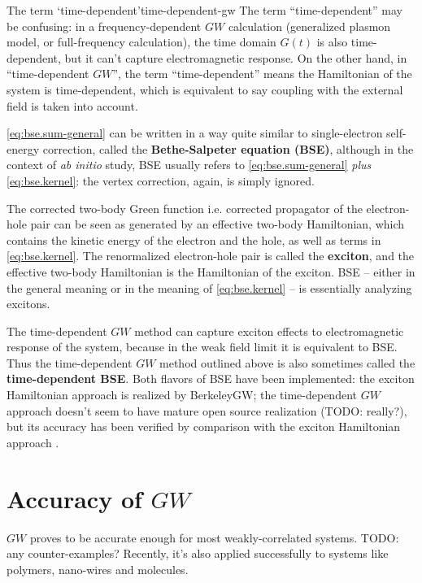 \documentclass[hyperref, a4paper, 12pt]{report}
\newcommand*{\concept}[1]{{\textbf{#1}}}
\newcommand*{\abinitio}{\textit{ab initio}}
\begin{document}
\begin{infobox}{The term `time-dependent'}{time-dependent-gw}
    The term ``time-dependent'' may be confusing:
    in a frequency-dependent $GW$ calculation 
    (generalized plasmon model, or full-frequency calculation),
    the time domain $G(t)$ is also time-dependent,
    but it can't capture electromagnetic response.
    On the other hand, in ``time-dependent $GW$'',
    the term ``time-dependent''
    means the Hamiltonian of the system is time-dependent,
    which is equivalent to say coupling with the external field 
    is taken into account. 
\end{infobox}

\eqref{eq:bse.sum-general} can be written in a way 
quite similar to single-electron self-energy correction,
called the \concept{Bethe-Salpeter equation (BSE)},
although in the context of \abinitio{} study, 
BSE usually refers to \eqref{eq:bse.sum-general} \emph{plus} \eqref{eq:bse.kernel}:
the vertex correction, again, is simply ignored.

The corrected two-body Green function i.e. corrected propagator of the electron-hole pair 
can be seen as generated by 
an effective two-body Hamiltonian,
which contains the kinetic energy of the electron and the hole,
as well as terms in \eqref{eq:bse.kernel}.
The renormalized electron-hole pair 
is called the \concept{exciton},
and the effective two-body Hamiltonian is the Hamiltonian of the exciton. 
BSE -- either in the general meaning or in the meaning of \eqref{eq:bse.kernel} -- 
is essentially analyzing excitons.

The time-dependent $GW$ method 
can capture exciton effects to electromagnetic response of the system,
because in the weak field limit 
it is equivalent to BSE.
Thus the time-dependent $GW$ method outlined above 
is also sometimes called the \concept{time-dependent BSE}.
Both flavors of BSE have been implemented:
the exciton Hamiltonian approach is realized by BerkeleyGW;
the time-dependent $GW$ approach doesn't seem to have mature open source realization (TODO: really?),
but its accuracy has been verified by comparison with the exciton Hamiltonian approach
\cite{attaccalite2011real}.

\section{Accuracy of $GW$}


$GW$ proves to be accurate enough for most weakly-correlated systems.
TODO: any counter-examples?
Recently, it's also applied successfully to systems like polymers, nano-wires and molecules.
\end{document}

